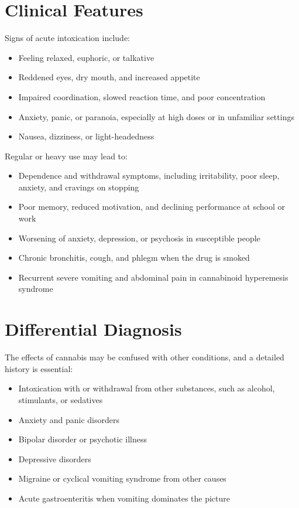 \section*{Clinical Features}
Signs of acute intoxication include:
\begin{itemize}
    \item Feeling relaxed, euphoric, or talkative
    \item Reddened eyes, dry mouth, and increased appetite
    \item Impaired coordination, slowed reaction time, and poor concentration
    \item Anxiety, panic, or paranoia, especially at high doses or in unfamiliar settings
    \item Nausea, dizziness, or light-headedness
\end{itemize}
Regular or heavy use may lead to:
\begin{itemize}
    \item Dependence and withdrawal symptoms, including irritability, poor sleep, anxiety, and cravings on stopping
    \item Poor memory, reduced motivation, and declining performance at school or work
    \item Worsening of anxiety, depression, or psychosis in susceptible people
    \item Chronic bronchitis, cough, and phlegm when the drug is smoked
    \item Recurrent severe vomiting and abdominal pain in cannabinoid hyperemesis syndrome
\end{itemize}

\section*{Differential Diagnosis}
The effects of cannabis may be confused with other conditions, and a detailed history is essential:
\begin{itemize}
    \item Intoxication with or withdrawal from other substances, such as alcohol, stimulants, or sedatives
    \item Anxiety and panic disorders
    \item Bipolar disorder or psychotic illness
    \item Depressive disorders
    \item Migraine or cyclical vomiting syndrome from other causes
    \item Acute gastroenteritis when vomiting dominates the picture
\end{itemize}

